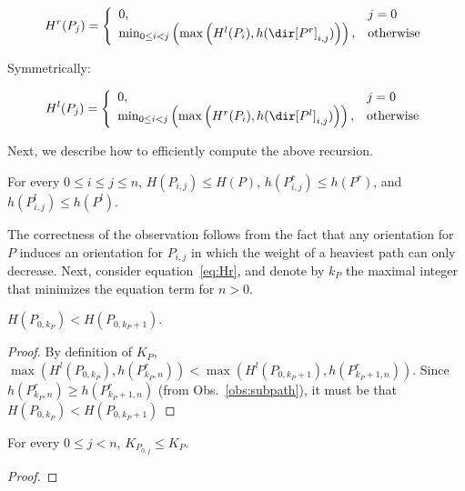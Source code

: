 \begin{equation}\label{eq:Hr}
H^r(P_j) = \left\{\begin{array}{ll}
0, & j = 0\\
\min_{0 \leq i < j}\left(\max\left(H^l(P_i), h(\dir[P^r]_{i, j})\right)\right), & \text{otherwise}\\
\end{array}\right.
\end{equation}

Symmetrically: 

\begin{equation}\label{eq:Hl}
H^l(P_j) = \left\{\begin{array}{ll}
0, & j = 0\\
\min_{0 \leq i < j}\left(\max\left(H^r(P_i), h(\dir[P^l]_{i, j})\right)\right), & \text{otherwise}\\
\end{array}\right.
\end{equation}


Next, we describe how to efficiently compute the above recursion. 


\begin{observation}
	\label{obs:subpath}
	For every $0 \leq i \leq j \leq n$, $H(P_{i, j}) \leq H(P)$, $h(P^r_{i, j}) \leq h(P^r)$, and $h(P^l_{i, j}) \leq h(P^l)$.
\end{observation}

The correctness of the observation follows from the fact that any orientation for $P$ induces an orientation for $P_{i, j}$ in which the weight of a heaviest path can only decrease. Next, consider equation~\ref{eq:Hr}, and denote by $k_P$ the maximal integer that minimizes the equation term for $n > 0$. 

\begin{claim}
	\label{clm:kp}
	$H(P_{0, k_P}) < H(P_{0, k_P+1})$.
\end{claim}

\begin{proof}
	By definition of $K_P$, $\max\left(H^l(P_{0, k_P}), h(P^r_{k_P, n})\right) < \max\left(H^l(P_{0, k_P + 1}), h(P^r_{k_P + 1, n})\right)$. Since $h(P^r_{k_P, n}) \geq h(P^r_{k_P+1, n})$ (from Obs.~\ref{obs:subpath}), it must be that $H(P_{0, k_P}) < H(P_{0, k_P+1})$
\end{proof}


\begin{claim}
	\label{clm:kp_monotonicity}
	For every $0 \leq j < n$, $K_{P_{0, j}} \leq K_P$.
\end{claim}

\begin{proof}
	
\end{proof}
